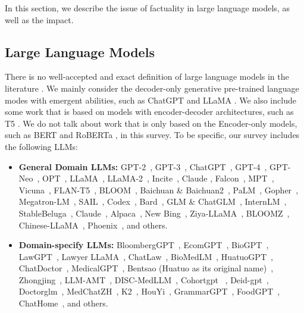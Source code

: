 
In this section, we describe the issue of factuality in large language models, as well as the impact.

\subsection{Large Language Models}
There is no well-accepted and exact definition of large language models in the literature \citep{chang2023survey,LLMSurvey,huang2022towards}. We mainly consider the decoder-only generative pre-trained language modes with emergent abilities, such as ChatGPT \citep{chatgpt} and LLaMA \citep{llama,llama2}. We also include some work that is based on models with encoder-decoder architectures, such as T5 \citep{t5}. We do not talk about work that is only based on the Encoder-only models, such as BERT \citep{bert} and RoBERTa \citep{RoBERTa}, in this survey. To be specific, our survey includes the following LLMs:

\begin{itemize}[topsep=0pt,itemsep=0pt,parsep=0pt,partopsep=0pt,leftmargin=*]
    \item \textbf{General Domain LLMs:}
GPT-2~\citep{GPT2},
GPT-3~\citep{GPT-3}, 
ChatGPT~\citep{chatgpt}, 
GPT-4~\citep{GPT4},
GPT-Neo~\citep{gpt-neo},
OPT~\citep{zhang2022opt}, 
LLaMA~\citep{llama}, 
LLaMA-2~\citep{llama2}, Incite~\citep{together2023redpajama, incite}, 
Claude \citep{Claude},
Falcon~\citep{falcon40b}, 
MPT~\cite{MosaicML2023Introducing}, 
Vicuna~\citep{vicuna2023}, 
FLAN-T5~\cite{chung2022scaling}, BLOOM~\citep{scao2022bloom}, 
Baichuan \&   Baichuan2~\citep{yang2023baichuan}, 
PaLM~\citep{chowdhery2022palm}, 
Gopher~\citep{Gopher}, 
Megatron-LM~\citep{shoeybi2019megatron}, 
SAIL~\citep{luo2023sail}, 
Codex~\citep{chen2021evaluating}, 
Bard~\citep{bard}, 
GLM \&
ChatGLM~\citep{glm},
InternLM~\citep{team2023internlm},
StableBeluga~\citep{StableBelugaModels},
Claude~\citep{Claude},
Alpaca~\citep{alpaca},
New Bing~\citep{BingChat},
Ziya-LLaMA~\citep{fengshenbang},
BLOOMZ~\citep{muennighoff2022crosslingual},
Chinese-LLaMA~\citep{chinese-llama-alpaca},
Phoenix~\citep{phoenix-2023}, and others.

\item \textbf{Domain-specify LLMs:} 
BloombergGPT~\citep{BloombergGPT}, 
EcomGPT~\citep{li2023ecomgpt}, 
BioGPT~\citep{luo2022biogpt},
LawGPT~\citep{nguyen2023brief}, 
Lawyer LLaMA~\citep{huang2023lawyer}, ChatLaw~\citep{ChatLaw}, BioMedLM~\citep{venigalla2022biomedlm}, HuatuoGPT~\citep{zhang2023huatuogpt}, ChatDoctor~\citep{li2023chatdoctor}, MedicalGPT~\citep{MedicalGPT}, 
Bentsao (Huatuo as its original name)~\citep{huatuo}, 
Zhongjing~\citep{yang2023zhongjing},
LLM-AMT~\citep{wang2023augmenting},
DISC-MedLLM~\citep{bao2023disc},
Cohortgpt ~\citep{guan2023cohortgpt},
Deid-gpt~\citep{liu2023deid},
Doctorglm~\citep{xiong2023doctorglm},
MedChatZH~\citep{tan2023medchatzh},
K2~\citep{deng2023learning},
HouYi~\citep{bai2023houyi},
GrammarGPT~\citep{fan2023grammargpt},
FoodGPT~\citep{qi2023foodgpt},
ChatHome~\citep{wen2023chathome},
and others.
\end{itemize}


